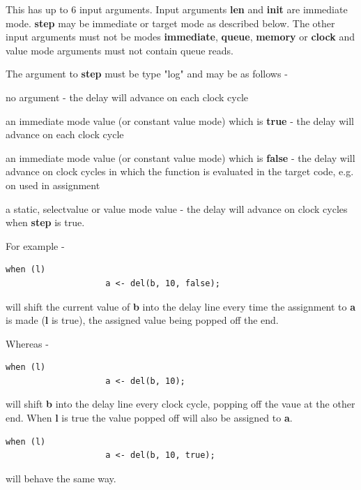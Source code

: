             This has up to 6 input arguments. Input arguments {\bf len} and {\bf
            init} are immediate mode. {\bf step} may be immediate or target mode
            as described below. The other input arguments must not be modes {\bf
            immediate}, {\bf queue}, {\bf memory} or {\bf clock} and value mode
            arguments must not contain queue reads.
            
            The argument to {\bf step} must be type "log" and may be as follows -
            \blist
            \item   no argument - the delay will advance on each clock cycle
            \item   an immediate mode value (or constant value mode) which is
                    {\bf true} - the delay will advance on each clock cycle
            \item   an immediate mode value (or constant value mode) which is
                    {\bf false} - the delay will advance on clock cycles in
                    which the function is evaluated in the target code, e.g.
                    on used in assignment
            \item   a static, selectvalue or value mode value - the delay will
                    advance on clock cycles when {\bf step} is true.
            \blend
            
            For example -
            \begin{lstlisting}[gobble=12, language=threepl]
                when (l)
                    a <- del(b, 10, false);
            \end{lstlisting}
            will shift the current value of {\bf b} into the delay line every
            time the assignment to {\bf a} is made ({\bf l} is true), the
            assigned value being popped off the end.
            
            Whereas -
            \begin{lstlisting}[gobble=12, language=threepl]
                when (l)
                    a <- del(b, 10);
            \end{lstlisting}
            will shift {\bf b} into the delay line every clock cycle, popping
            off the vaue at the other end. When {\bf l} is true the value popped
            off will also be assigned to {\bf a}.
            \begin{lstlisting}[gobble=12, language=threepl]
                when (l)
                    a <- del(b, 10, true);
            \end{lstlisting}
            will behave the same way.

